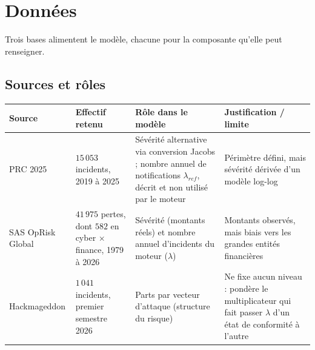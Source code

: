 
\chapter{Données}
\label{chap:donnees}
\label{part:donnees}


Trois bases alimentent le modèle, chacune pour la composante qu'elle peut renseigner.

\section{Sources et rôles}
\label{sec:carto}

\begin{center}
\renewcommand{\arraystretch}{1.3}
\begin{tabular}{>{\raggedright}p{2.75cm} >{\raggedright}p{2.6cm} >{\raggedright}p{3.9cm} >{\raggedright\arraybackslash}p{4.05cm}}
\toprule
\rowcolor{lightblue}
\textbf{Source} & \textbf{Effectif retenu} & \textbf{Rôle dans le modèle} & \textbf{Justification / limite} \\
\midrule
PRC 2025 & $15\,053$ incidents, 2019 à 2025 & Sévérité alternative via conversion Jacobs ; nombre annuel de notifications $\lambda_{ref}$, décrit et non utilisé par le moteur &
Périmètre défini, mais sévérité dérivée d'un modèle log-log \\
\addlinespace
SAS OpRisk Global & $41\,975$ pertes, dont $582$ en cyber $\times$ finance, 1979 à 2026 & Sévérité (montants réels) et nombre annuel d'incidents du moteur ($\lambda$) &
Montants observés, mais biais vers les grandes entités financières \\
\addlinespace
Hackmageddon & $1\,041$ incidents, premier semestre 2026 & Parts par vecteur d'attaque (structure du risque) &
Ne fixe aucun niveau : pondère le multiplicateur qui fait passer $\lambda$ d'un état de conformité à l'autre \\
\bottomrule
\end{tabular}
\end{center}

